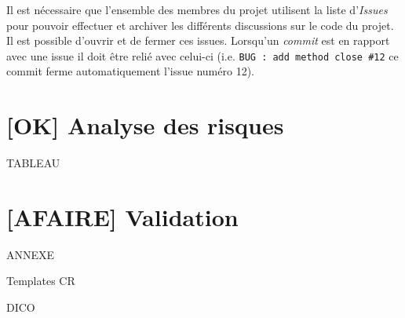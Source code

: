 \documentclass[10pt,a4paper]{article}
\begin{document}
Il est nécessaire que l'ensemble des membres du projet utilisent la liste d'\textit{Issues} pour pouvoir effectuer et archiver les différents discussions sur le code du projet. Il est possible d'ouvrir et de fermer ces issues. Lorsqu'un \textit{commit} est en rapport avec une issue il doit être relié avec celui-ci (i.e. \verb|BUG : add method close #12| ce commit ferme automatiquement l'issue numéro 12).






\section{[OK] Analyse des risques}
TABLEAU  %



\section{[AFAIRE] Validation}


\newpage
\listoffigures
\newpage

\begin{appendix}

ANNEXE 

Templates CR

DICO

\end{appendix}
\end{document}
